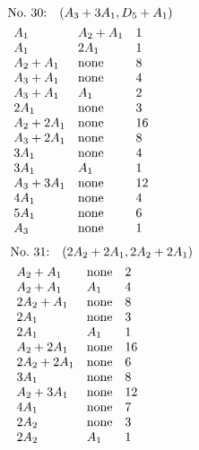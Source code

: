 %
%
\begin{align*}
&\hbox to 4cm {\textrm{No.~30:}\quad$(A_{3}+3A_{1}, D_{5}+A_{1})$\hss}\\ 
&\begin{array}{lll}
A_{1} & A_{2}+A_{1} & 1\\
A_{1} & 2A_{1} & 1\\
A_{2}+A_{1} & \none & 8\\
A_{3}+A_{1} & \none & 4\\
A_{3}+A_{1} & A_{1} & 2\\
2A_{1} & \none & 3\\
A_{2}+2A_{1} & \none & 16\\
A_{3}+2A_{1} & \none & 8\\
3A_{1} & \none & 4\\
3A_{1} & A_{1} & 1\\
A_{3}+3A_{1} & \none & 12\\
4A_{1} & \none & 4\\
5A_{1} & \none & 6\\
A_{3} & \none & 1\\
\end{array}
\end{align*}
%
%
\begin{align*}
&\hbox to 4cm {\textrm{No.~31:}\quad$(2A_{2}+2A_{1}, 2A_{2}+2A_{1})$\hss}\\ 
&\begin{array}{lll}
A_{2}+A_{1} & \none & 2\\
A_{2}+A_{1} & A_{1} & 4\\
2A_{2}+A_{1} & \none & 8\\
2A_{1} & \none & 3\\
2A_{1} & A_{1} & 1\\
A_{2}+2A_{1} & \none & 16\\
2A_{2}+2A_{1} & \none & 6\\
3A_{1} & \none & 8\\
A_{2}+3A_{1} & \none & 12\\
4A_{1} & \none & 7\\
2A_{2} & \none & 3\\
2A_{2} & A_{1} & 1\\
\end{array}
\end{align*}
%
%
